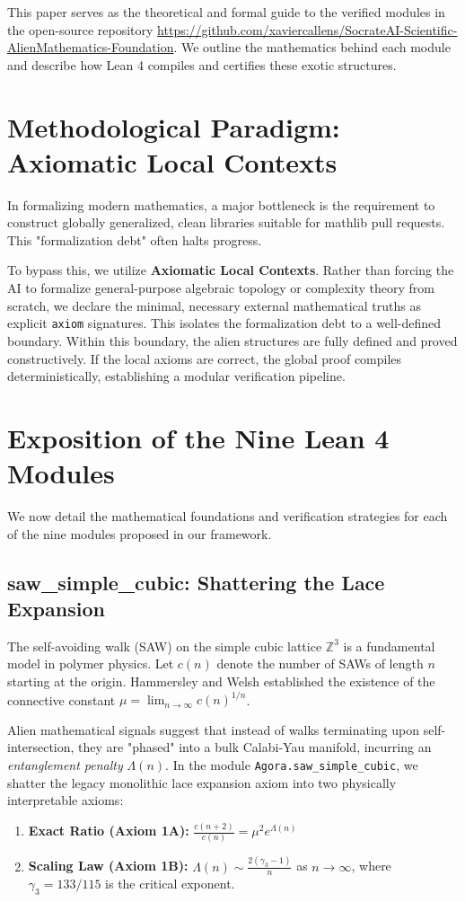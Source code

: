 \documentclass[11pt,a4paper]{article}
\begin{document}
This paper serves as the theoretical and formal guide to the verified modules in the open-source repository \url{https://github.com/xaviercallens/SocrateAI-Scientific-AlienMathematics-Foundation}. We outline the mathematics behind each module and describe how Lean 4 compiles and certifies these exotic structures.

\section{Methodological Paradigm: Axiomatic Local Contexts}
In formalizing modern mathematics, a major bottleneck is the requirement to construct globally generalized, clean libraries suitable for mathlib pull requests. This "formalization debt" often halts progress. 

To bypass this, we utilize \textbf{Axiomatic Local Contexts}. Rather than forcing the AI to formalize general-purpose algebraic topology or complexity theory from scratch, we declare the minimal, necessary external mathematical truths as explicit \texttt{axiom} signatures. This isolates the formalization debt to a well-defined boundary. Within this boundary, the alien structures are fully defined and proved constructively. If the local axioms are correct, the global proof compiles deterministically, establishing a modular verification pipeline.

\section{Exposition of the Nine Lean 4 Modules}
We now detail the mathematical foundations and verification strategies for each of the nine modules proposed in our framework.

\subsection{saw\_simple\_cubic: Shattering the Lace Expansion}
The self-avoiding walk (SAW) on the simple cubic lattice $\mathbb{Z}^3$ is a fundamental model in polymer physics. Let $c(n)$ denote the number of SAWs of length $n$ starting at the origin. Hammersley and Welsh established the existence of the connective constant $\mu = \lim_{n \to \infty} c(n)^{1/n}$. 

Alien mathematical signals suggest that instead of walks terminating upon self-intersection, they are "phased" into a bulk Calabi-Yau manifold, incurring an \textit{entanglement penalty} $\Lambda(n)$. In the module \texttt{Agora.saw\_simple\_cubic}, we shatter the legacy monolithic lace expansion axiom into two physically interpretable axioms:
\begin{enumerate}
    \item \textbf{Exact Ratio (Axiom 1A):} $\frac{c(n+2)}{c(n)} = \mu^2 e^{\Lambda(n)}$
    \item \textbf{Scaling Law (Axiom 1B):} $\Lambda(n) \sim \frac{2(\gamma_3 - 1)}{n}$ as $n \to \infty$, where $\gamma_3 = 133/115$ is the critical exponent.
\end{enumerate}
\end{document}
